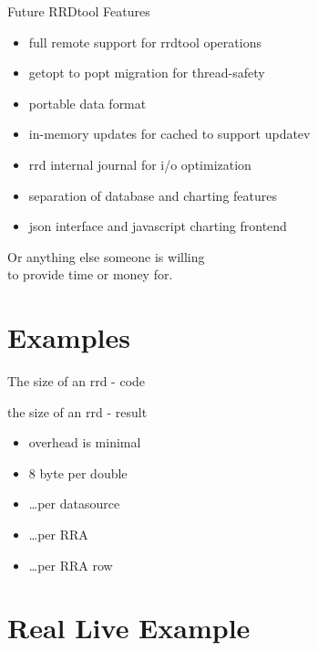 \begin{frame}{Future RRDtool Features}
\begin{itemize}[<+-| alert@+>]
\item full remote support for rrdtool operations
\item getopt to popt migration for thread-safety
\item portable data format
\item in-memory updates for cached to support updatev
\item rrd internal journal for i/o optimization
\item separation of database and charting features
\item json interface and javascript charting frontend
\end{itemize}

\pause
Or anything else someone is willing\\
to provide time or money for.
\end{frame}


\section{Examples}

\begin{frame}{The size of an rrd - code}

\end{frame}

\begin{frame}{the size of an rrd - result}

\begin{itemize}[<+-| alert@+>]
\item overhead is minimal
\item 8 byte per double 
\item \ldots per datasource
\item \ldots per RRA
\item \ldots per RRA row
\end{itemize}
\end{frame}



\newpage  
\section{Real Live Example}

